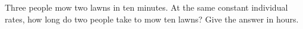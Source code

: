 Three people mow two lawns in ten minutes. At the same constant individual rates, how long do two people take to mow ten lawns? Give the answer in hours.
